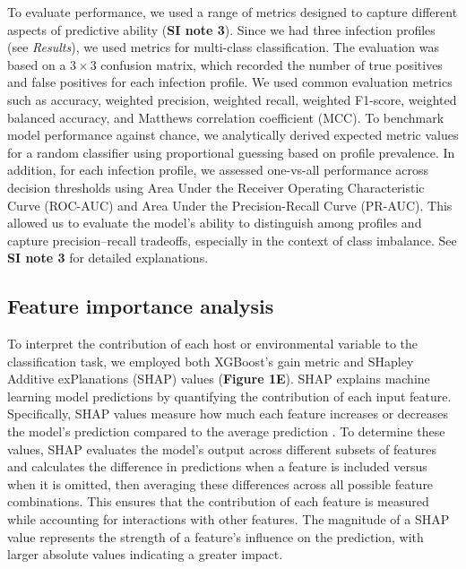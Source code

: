 \documentclass[oneside, a4paper, onecolumn, 11pt]{article}
\begin{document}
To evaluate performance, we used a range of metrics designed to capture different aspects of predictive ability \citep{Poisot2023-jo, Grandini2020-nl} (\textbf{SI note 3}). Since we had three infection profiles (see \textit{Results}), we used metrics for multi-class classification. The evaluation was based on a $3\times3$ confusion matrix, which recorded the number of true positives and false positives for each infection profile. We used common evaluation metrics such as accuracy, weighted precision, weighted recall, weighted F1-score, weighted balanced accuracy, and Matthews correlation coefficient (MCC). To benchmark model performance against chance, we analytically derived expected metric values for a random classifier using proportional guessing based on profile prevalence. In addition, for each infection profile, we assessed one-vs-all performance across decision thresholds using Area Under the Receiver Operating Characteristic Curve (ROC-AUC) and Area Under the Precision-Recall Curve (PR-AUC). This allowed us to evaluate the model’s ability to distinguish among profiles and capture precision–recall tradeoffs, especially in the context of class imbalance. See \textbf{SI note 3} for detailed explanations.

\subsection*{Feature importance analysis}
To interpret the contribution of each host or environmental variable to the classification task, we employed both XGBoost’s gain metric and SHapley Additive exPlanations (SHAP) values (\textbf{Figure 1E}). SHAP explains machine learning model predictions by quantifying the contribution of each input feature. Specifically, SHAP values measure how much each feature increases or decreases the model’s prediction compared to the average prediction \citep{Lundberg2017-dr}. To determine these values, SHAP evaluates the model’s output across different subsets of features and calculates the difference in predictions when a feature is included versus when it is omitted, then averaging these differences across all possible feature combinations. This ensures that the contribution of each feature is measured while accounting for interactions with other features. The magnitude of a SHAP value represents the strength of a feature’s influence on the prediction, with larger absolute values indicating a greater impact. 
\end{document}
